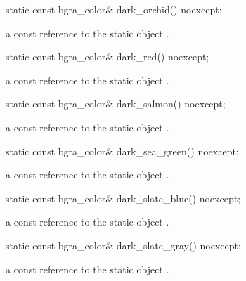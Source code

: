 \begin{itemdecl}
static const bgra_color& dark_orchid() noexcept;
\end{itemdecl}
\begin{itemdescr}
\pnum
\returns
a const reference to the static  object .
\end{itemdescr}

\begin{itemdecl}
static const bgra_color& dark_red() noexcept;
\end{itemdecl}
\begin{itemdescr}
\pnum
\returns
a const reference to the static  object .
\end{itemdescr}

\begin{itemdecl}
static const bgra_color& dark_salmon() noexcept;
\end{itemdecl}
\begin{itemdescr}
\pnum
\returns
a const reference to the static  object .
\end{itemdescr}

\begin{itemdecl}
static const bgra_color& dark_sea_green() noexcept;
\end{itemdecl}
\begin{itemdescr}
\pnum
\returns
a const reference to the static  object .
\end{itemdescr}

\begin{itemdecl}
static const bgra_color& dark_slate_blue() noexcept;
\end{itemdecl}
\begin{itemdescr}
\pnum
\returns
a const reference to the static  object .
\end{itemdescr}

\begin{itemdecl}
static const bgra_color& dark_slate_gray() noexcept;
\end{itemdecl}
\begin{itemdescr}
\pnum
\returns
a const reference to the static  object .
\end{itemdescr}

